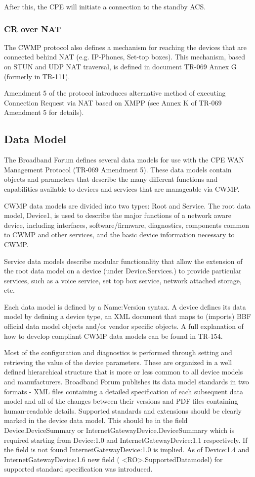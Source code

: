 After this, the CPE will initiate a connection to the standby ACS.

\subsubsection{CR over NAT}
The CWMP protocol also defines a mechanism for reaching the devices that are connected behind NAT (e.g. IP-Phones, Set-top boxes). This mechanism, based on STUN and UDP NAT traversal, is defined in document TR-069 Annex G (formerly in TR-111).

Amendment 5 of the protocol introduces alternative method of executing Connection Request via NAT based on XMPP (see Annex K of TR-069 Amendment 5 for details).


\subsection{Data Model}
The Broadband Forum defines several data models for use with the CPE WAN Management Protocol (TR-069 Amendment 5). These data models contain objects and parameters that describe the many different functions and capabilities available to devices and services that are manageable via CWMP.

CWMP data models are divided into two types: Root and Service. The root data model, Device1, is used to describe the major functions of a network aware device, including interfaces, software/firmware, diagnostics, components common to CWMP and other services, and the basic device information necessary to CWMP.

Service data models describe modular functionality that allow the extension of the root data model on a device (under Device.Services.) to provide particular services, such as a voice service, set top box service, network attached storage, etc.

Each data model is defined by a Name:Version syntax. A device defines its data model by defining a device type, an XML document that maps to (imports) BBF official data model objects and/or vendor specific objects. A full explanation of how to develop compliant CWMP data models can be found in TR-154.

Most of the configuration and diagnostics is performed through setting and retrieving the value of the device parameters. These are organized in a well defined hierarchical structure that is more or less common to all device models and manufacturers. Broadband Forum publishes its data model standards in two formats - XML files containing a detailed specification of each subsequent data model and all of the changes between their versions and PDF files containing human-readable details. Supported standards and extensions should be clearly marked in the device data model. This should be in the field Device.DeviceSummary or InternetGatewayDevice.DeviceSummary which is required starting from Device:1.0 and InternetGatewayDevice:1.1 respectively. If the field is not found InternetGatewayDevice:1.0 is implied. As of Device:1.4 and InternetGatewayDevice:1.6 new field ( <RO>.SupportedDatamodel) for supported standard specification was introduced.

